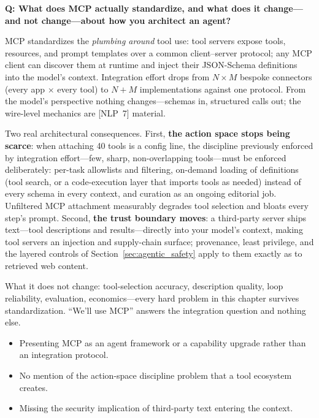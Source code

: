 \begin{interviewq}
\textbf{Q: What does MCP actually standardize, and what does it change---and not change---about how you architect an agent?}

 \quad {} \quad \badgefreq{\freqmed}

\stronganswer

MCP standardizes the \textit{plumbing around} tool use: tool servers expose tools, resources, and prompt templates over a common client--server protocol; any MCP client can discover them at runtime and inject their JSON-Schema definitions into the model's context. Integration effort drops from $N \times M$ bespoke connectors (every app $\times$ every tool) to $N + M$ implementations against one protocol. From the model's perspective nothing changes---schemas in, structured calls out; the wire-level mechanics are [NLP~7] material.

Two real architectural consequences. First, \textbf{the action space stops being scarce}: when attaching 40 tools is a config line, the discipline previously enforced by integration effort---few, sharp, non-overlapping tools---must be enforced deliberately: per-task allowlists and filtering, on-demand loading of definitions (tool search, or a code-execution layer that imports tools as needed) instead of every schema in every context, and curation as an ongoing editorial job. Unfiltered MCP attachment measurably degrades tool selection and bloats every step's prompt. Second, \textbf{the trust boundary moves}: a third-party server ships text---tool descriptions and results---directly into your model's context, making tool servers an injection and supply-chain surface; provenance, least privilege, and the layered controls of Section~\ref{sec:agentic_safety} apply to them exactly as to retrieved web content.

What it does not change: tool-selection accuracy, description quality, loop reliability, evaluation, economics---every hard problem in this chapter survives standardization. ``We'll use MCP'' answers the integration question and nothing else.

\redflags
\begin{itemize}
    \item Presenting MCP as an agent framework or a capability upgrade rather than an integration protocol.
    \item No mention of the action-space discipline problem that a tool ecosystem creates.
    \item Missing the security implication of third-party text entering the context.
\end{itemize}


\end{interviewq}
